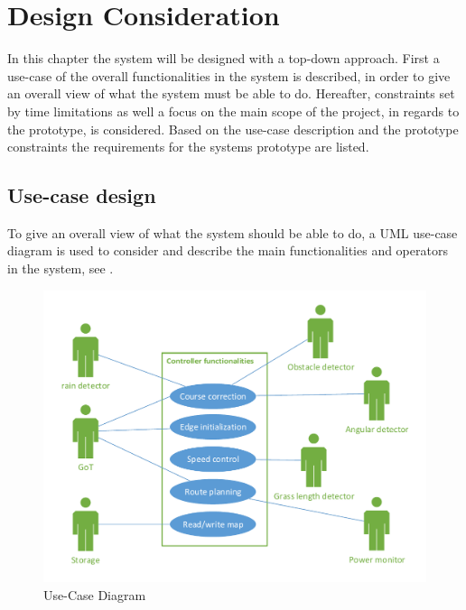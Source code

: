 \chapter{Design Consideration}
\vspace{-5 mm}
In this chapter the system will be designed with a top-down approach. First a use-case of the overall functionalities in the system is described, in order to give an overall view of what the system must be able to do. Hereafter, constraints set by time limitations as well a focus on the main scope of the project, in regards to the prototype, is considered. Based on the use-case description and the prototype constraints the requirements for the systems prototype are listed.
\vspace{-4 mm}
\section{Use-case design}
To give an overall view of what the system should be able to do, a UML use-case diagram is used to consider and describe the main functionalities and operators in the system, see .
\vspace{-3 mm}
 \begin{figure}[H]
	\centering
	\includegraphics[scale=0.8]{figures/P5UseCase.pdf}
	\caption{Use-Case Diagram}
	\label{fig:usecase}
	\flushleft
\end{figure}

